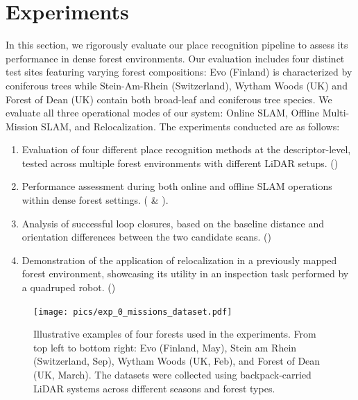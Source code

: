 \chapter{Experiments}
\label{chapter:experiments} 

In this section, we rigorously evaluate our place recognition pipeline to assess its performance in dense forest environments. Our evaluation includes four distinct test sites featuring varying forest compositions: Evo (Finland) is characterized by coniferous trees while Stein-Am-Rhein (Switzerland), Wytham Woods (UK) and Forest of Dean (UK) contain both broad-leaf and coniferous tree species. We evaluate all three operational modes of our system: Online SLAM, Offline Multi-Mission SLAM, and Relocalization.
The experiments conducted are as follows:
\begin{enumerate}[label=\Roman*.]
  \listparindent=-20pt
  \item Evaluation of four different place recognition methods at the descriptor-level, tested across multiple forest environments with different LiDAR setups. () 
  \item Performance assessment during both online and offline SLAM operations within dense forest settings. ( \& ).
  \item Analysis of successful loop closures, based on the baseline distance and orientation differences between the two candidate scans. ()
  \item Demonstration of the application of relocalization in a previously mapped forest environment, showcasing its utility in an inspection task performed by a quadruped robot. ()
\end{enumerate}

\begin{figure}[htbp]
  \centering
  \texttt{[image: pics/exp\_0\_missions\_dataset.pdf]}
  \caption{Illustrative examples of four forests used in the experiments. From top left to bottom right: Evo (Finland, May), Stein am Rhein (Switzerland, Sep), Wytham Woods (UK, Feb), and Forest of Dean (UK, March). The datasets were collected using backpack-carried LiDAR systems across different seasons and forest types.}
  \label{fig:missions_dataset}
\end{figure}


